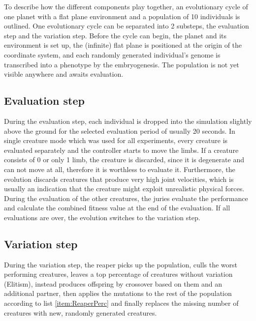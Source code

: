 \documentclass[main]{subfiles}
\begin{document}
To describe how the different components play together, an evolutionary cycle of one planet with a flat plane environment and a population of 10 individuals is outlined. One evolutionary cycle can be separated into 2 substeps, the evaluation step and the variation step. Before the cycle can begin, the planet and its environment is set up, the (infinite) flat plane is positioned at the origin of the coordinate system, and each randomly generated individual's genome is transcribed into a phenotype by the embryogenesis. The population is not yet visible anywhere and awaits evaluation.

\subsection{Evaluation step}

During the evaluation step, each individual is dropped into the simulation slightly above the ground for the selected evaluation period of usually 20 seconds. In single creature mode which was used for all experiments, every creature is evaluated separately and the controller starts to move the limbs. If a creature consists of 0 or only 1 limb, the creature is discarded, since it is degenerate and can not move at all, therefore it is worthless to evaluate it. Furthermore, the evolution discards creatures that produce very high joint velocities, which is usually an indication that the creature might exploit unrealistic physical forces. During the evaluation of the other creatures, the juries evaluate the performance and calculate the combined fitness value at the end of the evaluation. If all evaluations are over, the evolution switches to the variation step.

\subsection{Variation step}

During the variation step, the reaper picks up the population, culls the worst performing creatures, leaves a top percentage of creatures without variation (Elitism), instead produces offspring by crossover based on them and an additional partner, then applies the mutations to the rest of the population according to list \ref{item:ReaperPerc} and finally replaces the missing number of creatures with new, randomly generated creatures.
\end{document}

